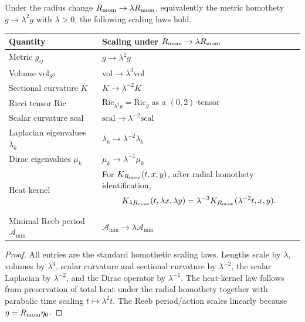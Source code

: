 \documentclass[11pt]{article}
\begin{document}
\begin{proposition}
\label{p1:prop:homothetic-scaling-laws}
Under the radius change \(R_{\mathrm{mom}}\to\lambda R_{\mathrm{mom}}\), equivalently the metric
homothety \(g\to\lambda^2g\) with \(\lambda>0\), the following scaling laws
hold.
\begin{center}
\small
\setlength{\tabcolsep}{3pt}
\renewcommand{\arraystretch}{1.18}

\begin{tabular}{|
  L{3.6cm}|
  L{\dimexpr\linewidth-3.6cm-4\arrayrulewidth\relax}|
}
\hline
\textbf{Quantity} & \textbf{Scaling under \(R_{\mathrm{mom}} \to \lambda R_{\mathrm{mom}}\)} \\
\hline

Metric \(g_{ij}\)
& \(g \to \lambda^2 g\) \\
\hline

Volume \(\mathrm{vol}_{S^3}\)
& \(\mathrm{vol} \to \lambda^3 \mathrm{vol}\) \\
\hline

Sectional curvature \(K\)
& \(K \to \lambda^{-2}K\) \\
\hline

Ricci tensor \(\mathrm{Ric}\)
& \(\mathrm{Ric}_{\lambda^2 g}=\mathrm{Ric}_g\) as a \((0,2)\)-tensor \\
\hline

Scalar curvature \(\mathrm{scal}\)
& \(\mathrm{scal} \to \lambda^{-2}\mathrm{scal}\) \\
\hline

Laplacian eigenvalues \(\lambda_k\)
& \(\lambda_k \to \lambda^{-2}\lambda_k\) \\
\hline

Dirac eigenvalues \(\mu_k\)
& \(\mu_k \to \lambda^{-1}\mu_k\) \\
\hline

Heat kernel
& For \(K_{R_{\mathrm{mom}}}(t,x,y)\), after radial homothety identification,
  \[
    K_{\lambda R_{\mathrm{mom}}}(t,\lambda x,\lambda y)
    =
    \lambda^{-3}
    K_{R_{\mathrm{mom}}}(\lambda^{-2}t,x,y).
  \]
\\[-1.5ex]
\hline

Minimal Reeb period \(\mathcal A_{\min}\)
& \(\mathcal A_{\min} \to \lambda\mathcal A_{\min}\) \\
\hline

\end{tabular}
\end{center}
\end{proposition}

\begin{proof}
All entries are the standard homothetic scaling laws.  Lengths scale by \(\lambda\), volumes by \(\lambda^3\), scalar curvature and sectional curvature by \(\lambda^{-2}\), the scalar Laplacian by \(\lambda^{-2}\), and the Dirac operator by \(\lambda^{-1}\).  The heat-kernel law follows from preservation of total heat under the radial homothety together with parabolic time scaling \(t\mapsto\lambda^2t\).  The Reeb period/action scales linearly because \(\eta=R_{\mathrm{mom}}\eta_0\).
\end{proof}
\end{document}
